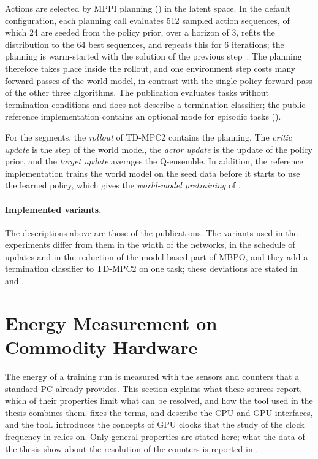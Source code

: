 Actions are selected by MPPI planning () in the latent space.
In the default configuration, each planning call evaluates \num{512} sampled action sequences, of which \num{24} are seeded from the policy prior, over a horizon of \num{3}, refits the distribution to the \num{64} best sequences, and repeats this for \num{6} iterations; the planning is warm-started with the solution of the previous step~\cite{hansen2024tdmpc2}.
The planning therefore takes place inside the rollout, and one environment step costs many forward passes of the world model, in contrast with the single policy forward pass of the other three algorithms.
The publication evaluates tasks without termination conditions and does not describe a termination classifier; the public reference implementation contains an optional mode for episodic tasks ().

For the segments, the \emph{rollout} of TD-MPC2 contains the planning.
The \emph{critic update} is the step of the world model, the \emph{actor update} is the update of the policy prior, and the \emph{target update} averages the Q-ensemble.
In addition, the reference implementation trains the world model on the seed data before it starts to use the learned policy, which gives the \emph{world-model pretraining} of .

\paragraph{Implemented variants.} The descriptions above are those of the publications.
The variants used in the experiments differ from them in the width of the networks, in the schedule of updates and in the reduction of the model-based part of MBPO, and they add a termination classifier to TD-MPC2 on one task; these deviations are stated in  and .


\section{Energy Measurement on Commodity Hardware}\label{sec:energy-measurement}

The energy of a training run is measured with the sensors and counters that a standard PC already provides.
This section explains what these sources report, which of their properties limit what can be resolved, and how the tool used in the thesis combines them.
 fixes the terms,  and  describe the CPU and GPU interfaces, and  the tool.
 introduces the concepts of GPU clocks that the study of the clock frequency in  relies on.
Only general properties are stated here; what the data of the thesis show about the resolution of the counters is reported in .

